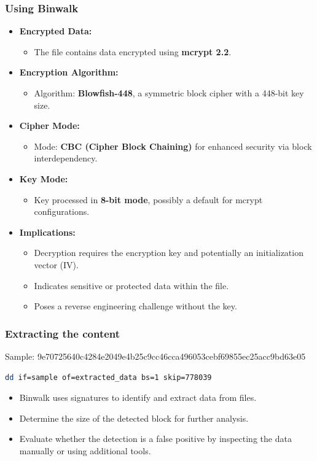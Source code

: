 \begin{frame}
\frametitle{Using Binwalk}

\begin{itemize}
    \item \textbf{Encrypted Data:}
    \begin{itemize}
        \item The file contains data encrypted using \textbf{mcrypt 2.2}.
    \end{itemize}
    \item \textbf{Encryption Algorithm:}
    \begin{itemize}
        \item Algorithm: \textbf{Blowfish-448}, a symmetric block cipher with a 448-bit key size.
    \end{itemize}
    \item \textbf{Cipher Mode:}
    \begin{itemize}
        \item Mode: \textbf{CBC (Cipher Block Chaining)} for enhanced security via block interdependency.
    \end{itemize}
    \item \textbf{Key Mode:}
    \begin{itemize}
        \item Key processed in \textbf{8-bit mode}, possibly a default for mcrypt configurations.
    \end{itemize}
    \item \textbf{Implications:}
    \begin{itemize}
        \item Decryption requires the encryption key and potentially an initialization vector (IV).
        \item Indicates sensitive or protected data within the file.
        \item Poses a reverse engineering challenge without the key.
    \end{itemize}
\end{itemize}

\end{frame}

\begin{frame}[fragile]
\frametitle{Extracting the content}
Sample: 9e70725640c4284e2049e4b25c9cc46cca496053cebf69855ec25acc9bd63e05
\begin{lstlisting}[language=bash, basicstyle=\ttfamily, frame=single, breaklines=true]
dd if=sample of=extracted_data bs=1 skip=778039
\end{lstlisting}

\begin{itemize}
    \item Binwalk uses signatures to identify and extract data from files.
    \item Determine the size of the detected block for further analysis.
    \item Evaluate whether the detection is a false positive by inspecting the data manually or using additional tools.
\end{itemize}

\end{frame}


